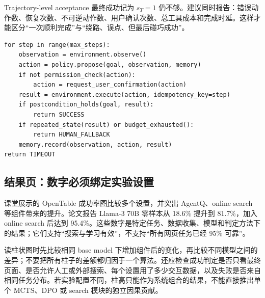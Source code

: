 





\begin{importantbox}{Trajectory-level acceptance}
最终成功记为 $s_T=1$ 仍不够。建议同时报告：错误动作数、恢复次数、不可逆动作数、用户确认次数、总工具成本和完成时延。这样才能区分“一次顺利完成”与“绕路、误点、但最后碰巧成功”。
\end{importantbox}

\begin{lstlisting}[caption={轨迹验证与恢复的伪代码}]
for step in range(max_steps):
    observation = environment.observe()
    action = policy.propose(goal, observation, memory)
    if not permission_check(action):
        action = request_user_confirmation(action)
    result = environment.execute(action, idempotency_key=step)
    if postcondition_holds(goal, result):
        return SUCCESS
    if repeated_state(result) or budget_exhausted():
        return HUMAN_FALLBACK
    memory.record(observation, action, result)
return TIMEOUT
\end{lstlisting}

\subsection{结果页：数字必须绑定实验设置}

课堂展示的 OpenTable 成功率图比较多个设置，并突出 AgentQ、online search 等组件带来的提升。论文报告 Llama-3 70B 零样本从 18.6\% 提升到 81.7\%，加入 online search 后达到 95.4\%。这些数字是特定任务、数据收集、模型和判定方法下的结果；它们支持“搜索与学习有效”，不支持“所有网页任务已经 95\% 可靠”。

读柱状图时先比较相同 base model 下增加组件后的变化，再比较不同模型之间的差异；不要把所有柱子的差额都归因于一个算法。还应检查成功判定是否只看最终页面、是否允许人工或外部搜索、每个设置用了多少交互数据，以及失败是否来自相同任务分布。若实验配置不同，柱高只能作为系统组合的结果，不能直接推出单个 MCTS、DPO 或 search 模块的独立因果贡献。

